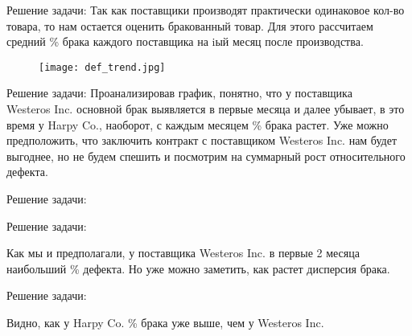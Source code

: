 \documentclass{beamer}
\begin{document}
\begin{frame}{Решение задачи:}
Так как поставщики производят практически одинаковое кол-во товара, то нам остается оценить бракованный товар.
Для этого рассчитаем средний \% брака каждого поставщика на iый месяц после производства.
\begin{figure}
\begin{center}
\texttt{[image: def\_trend.jpg]}
\end{center}
\end{figure}
\end{frame}
\begin{frame}{Решение задачи:}
Проанализировав график, понятно, что у поставщика \\ Westeros Inc. основной брак выявляется в первые месяца и далее убывает, в это время у Harpy Co., наоборот, с каждым месяцем \% брака растет. 
Уже можно предположить, что заключить контракт с поставщиком Westeros Inc. нам будет выгоднее, но не будем спешить и посмотрим на суммарный рост относительного дефекта.

\end{frame}

\begin{frame}{Решение задачи:}

\begin{figure}[htb]
\end{figure}
\end{frame}

\begin{frame}{Решение задачи:}

\begin{figure}[htb]
\end{figure}
Как мы и предполагали, у поставщика Westeros Inc. в первые 2 месяца наибольший \% дефекта.
Но уже можно заметить, как растет дисперсия брака.
\end{frame}


\begin{frame}{Решение задачи:}

\begin{figure}[htb]
\end{figure}
Видно, как у Harpy Co. \% брака уже выше, чем у Westeros Inc.
\end{frame}
\end{document}
